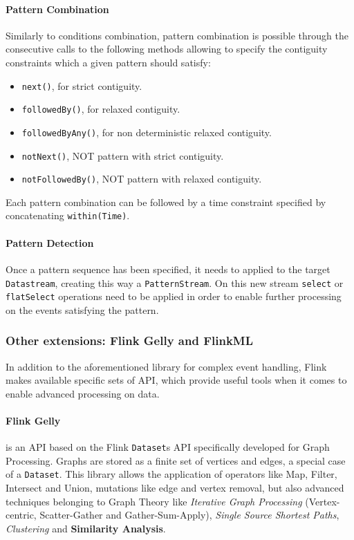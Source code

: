 \pagebreak

\paragraph{Pattern Combination}

Similarly to conditions combination, pattern combination is possible through the consecutive calls to the following methods allowing to specify the contiguity constraints which a given pattern should satisfy:

\begin{itemize}
    
    \item \texttt{next()}, for strict contiguity.
    \item \texttt{followedBy()}, for relaxed contiguity.
    \item \texttt{followedByAny()}, for non deterministic relaxed contiguity.
    \item \texttt{notNext()}, NOT pattern with strict contiguity.
    \item \texttt{notFollowedBy()}, NOT pattern with relaxed contiguity.

\end{itemize}

Each pattern combination can be followed by a time constraint specified by concatenating \texttt{within(Time)}.

\paragraph{Pattern Detection}

Once a pattern sequence has been specified, it needs to applied to the target \texttt{Datastream}, creating this way a \texttt{PatternStream}.
On this new stream \texttt{select} or \texttt{flatSelect} operations need to be applied in order to enable further processing on the events satisfying the pattern.

\subsubsection{Other extensions: Flink Gelly and FlinkML}

In addition to the aforementioned library for complex event handling, Flink makes available specific sets of API, which provide useful tools when it comes to enable advanced processing on data.

\paragraph{Flink Gelly} is an API based on the Flink \texttt{Dataset}s API specifically developed for Graph Processing. Graphs are stored as a finite set of vertices and edges, a special case of a \texttt{Dataset}. This library allows the application of operators like Map, Filter, Intersect and Union, mutations like edge and vertex removal, but also advanced techniques belonging to Graph Theory like \textit{Iterative Graph Processing} (Vertex-centric, Scatter-Gather and Gather-Sum-Apply), \textit{Single Source Shortest Paths}, \textit{Clustering} and \textbf{Similarity Analysis}.

